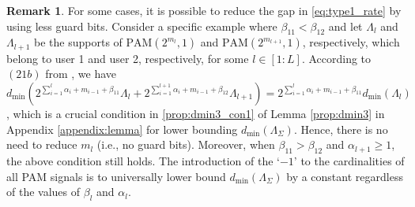 \documentclass[12pt, draftclsnofoot, onecolumn]{IEEEtran}
\theoremstyle{definition}
\newtheorem{remark}{Remark}
\begin{document}
\begin{remark}
For some cases, it is possible to reduce the gap in \eqref{eq:type1_rate} by using less guard bits. Consider a specific example where $\beta_{11}<\beta_{12}$ and let $\Lambda_l$ and $\Lambda_{l+1}$ be the supports of $\text{PAM}(2^{m_l},1)$ and $\text{PAM}(2^{m_{l+1}},1)$, respectively, which belong to user 1 and user 2, respectively, for some $l \in [1:L]$. According to $(21b)$ from \cite[Proposition 2]{7451210}, we have $d_{\min}(2^{\sum_{i=1}^l\alpha_i+m_{i-1}+\beta_{11}}\Lambda_l+2^{\sum_{i=1}^{l+1}\alpha_i+m_{i-1}+\beta_{12}}\Lambda_{l+1}) = 2^{\sum_{i=1}^l\alpha_i+m_{i-1}+\beta_{11}}d_{\min}(\Lambda_l)$, which is a crucial condition in \eqref{prop:dmin3_con1} of Lemma \ref{prop:dmin3} in Appendix \ref{appendix:lemma} for lower bounding $d_{\min}(\Lambda_{\Sigma})$. Hence, there is no need to reduce $m_l$ (i.e., no guard bits). Moreover, when $\beta_{11}>\beta_{12}$ and $\alpha_{l+1} \geq 1$, the above condition still holds. The introduction of the `$-1$' to the cardinalities of all PAM signals is to universally lower bound $d_{\min}(\Lambda_{\Sigma})$ by a constant regardless of the values of $\beta_l$ and $\alpha_l$.
\end{remark}
\end{document}
